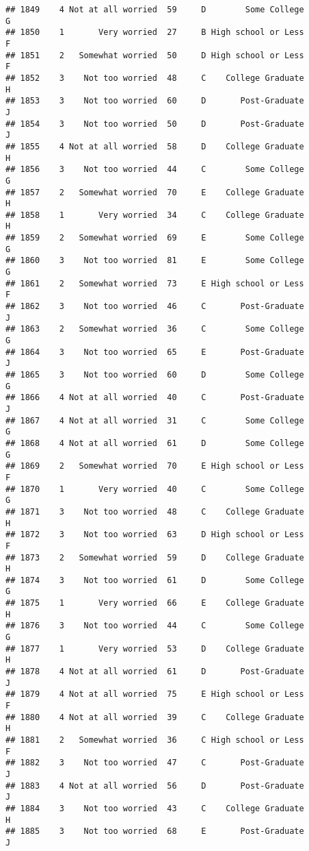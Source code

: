 \documentclass[
]{article}
\begin{document}
\begin{verbatim}
## 1849    4 Not at all worried  59     D        Some College         G
## 1850    1       Very worried  27     B High school or Less         F
## 1851    2   Somewhat worried  50     D High school or Less         F
## 1852    3    Not too worried  48     C    College Graduate         H
## 1853    3    Not too worried  60     D       Post-Graduate         J
## 1854    3    Not too worried  50     D       Post-Graduate         J
## 1855    4 Not at all worried  58     D    College Graduate         H
## 1856    3    Not too worried  44     C        Some College         G
## 1857    2   Somewhat worried  70     E    College Graduate         H
## 1858    1       Very worried  34     C    College Graduate         H
## 1859    2   Somewhat worried  69     E        Some College         G
## 1860    3    Not too worried  81     E        Some College         G
## 1861    2   Somewhat worried  73     E High school or Less         F
## 1862    3    Not too worried  46     C       Post-Graduate         J
## 1863    2   Somewhat worried  36     C        Some College         G
## 1864    3    Not too worried  65     E       Post-Graduate         J
## 1865    3    Not too worried  60     D        Some College         G
## 1866    4 Not at all worried  40     C       Post-Graduate         J
## 1867    4 Not at all worried  31     C        Some College         G
## 1868    4 Not at all worried  61     D        Some College         G
## 1869    2   Somewhat worried  70     E High school or Less         F
## 1870    1       Very worried  40     C        Some College         G
## 1871    3    Not too worried  48     C    College Graduate         H
## 1872    3    Not too worried  63     D High school or Less         F
## 1873    2   Somewhat worried  59     D    College Graduate         H
## 1874    3    Not too worried  61     D        Some College         G
## 1875    1       Very worried  66     E    College Graduate         H
## 1876    3    Not too worried  44     C        Some College         G
## 1877    1       Very worried  53     D    College Graduate         H
## 1878    4 Not at all worried  61     D       Post-Graduate         J
## 1879    4 Not at all worried  75     E High school or Less         F
## 1880    4 Not at all worried  39     C    College Graduate         H
## 1881    2   Somewhat worried  36     C High school or Less         F
## 1882    3    Not too worried  47     C       Post-Graduate         J
## 1883    4 Not at all worried  56     D       Post-Graduate         J
## 1884    3    Not too worried  43     C    College Graduate         H
## 1885    3    Not too worried  68     E       Post-Graduate         J

\end{verbatim}
\end{document}
